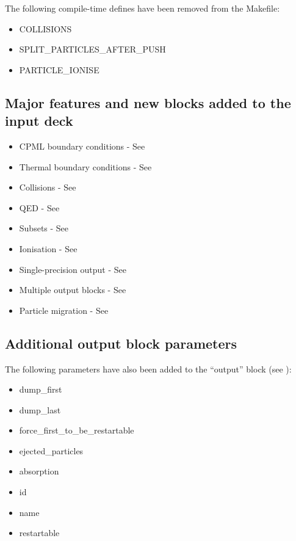 \noindent The following compile-time defines have been removed from the Makefile:
\begin{itemize}
\item COLLISIONS
\item SPLIT\_PARTICLES\_AFTER\_PUSH
\item PARTICLE\_IONISE
\end{itemize}

\subsection{Major features and new blocks added to the input deck}

\begin{itemize}
\item CPML boundary conditions - See 
\item Thermal boundary conditions - See 
\item Collisions - See 
\item QED - See 
\item Subsets - See 
\item Ionisation - See 
\item Single-precision output - See 
\item Multiple output blocks - See 
\item Particle migration - See 
\end{itemize}

\subsection{Additional output block parameters}

The following parameters have also been added to the ``output'' block
(see ):

\begin{itemize}
\item dump\_first
\item dump\_last
\item force\_first\_to\_be\_restartable
\item ejected\_particles
\item absorption
\item id
\item name
\item restartable
\end{itemize}


